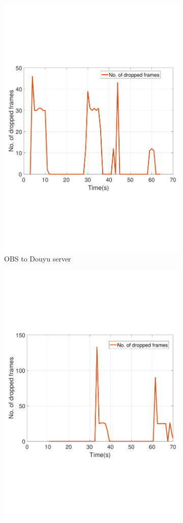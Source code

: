 \begin{figure}[htb]
\begin{subfigure}[b]{0.32\textwidth}
  \includegraphics[width=0.8\linewidth]{fig/obs_douyu_drop.pdf}
  \vspace{-0.05in}  
  \caption{OBS to Douyu server}
  \label{fig:obs-douyu-drop}
\end{subfigure}
\begin{subfigure}[b]{0.32\textwidth}
  \includegraphics[width=0.8\linewidth]{fig/douyu_drop.pdf}

\end{subfigure}
\end{figure}
